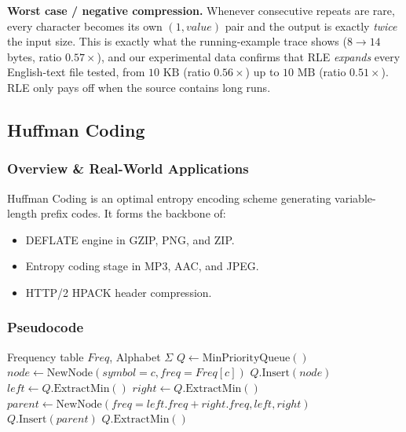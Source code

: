 \documentclass{article}
\begin{document}
\textbf{Worst case / negative compression.} Whenever consecutive repeats are rare, every character becomes its own $(1, value)$ pair and the output is exactly \emph{twice} the input size. This is exactly what the running-example trace shows ($8 \to 14$ bytes, ratio $0.57\times$), and our experimental data confirms that RLE \emph{expands} every English-text file tested, from $10\text{ KB}$ (ratio $0.56\times$) up to $10\text{ MB}$ (ratio $0.51\times$). RLE only pays off when the source contains long runs.

\cleardoublepage
\newpage

\subsection{Huffman Coding}

\subsubsection{Overview \& Real-World Applications}
Huffman Coding is an optimal entropy encoding scheme generating variable-length prefix codes. It forms the backbone of:
\begin{itemize}
    \item DEFLATE engine in GZIP, PNG, and ZIP.
    \item Entropy coding stage in MP3, AAC, and JPEG.
    \item HTTP/2 HPACK header compression.
\end{itemize}

\subsubsection{Pseudocode}
\begin{algorithm}[H]
\caption{Huffman Tree Construction}
\label{alg:huffman_tree}
\begin{algorithmic}[1]
\REQUIRE Frequency table $Freq$, Alphabet $\Sigma$
\STATE $Q \gets \text{MinPriorityQueue}()$
    \STATE $node \gets \text{NewNode}(symbol=c, freq=Freq[c])$
    \STATE $Q.\text{Insert}(node)$
\ENDFOR
{}
    \STATE $left \gets Q.\text{ExtractMin}()$
    \STATE $right \gets Q.\text{ExtractMin}()$
    \STATE $parent \gets \text{NewNode}(freq=left.freq + right.freq, left, right)$
    \STATE $Q.\text{Insert}(parent)$
\ENDWHILE
\RETURN $Q.\text{ExtractMin}()$
\end{algorithmic}
\end{algorithm}
\end{document}

